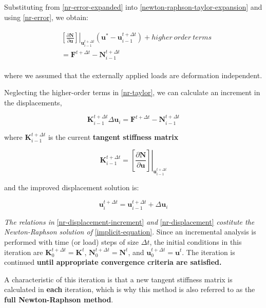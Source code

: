 \documentclass[10pt,b5paper,titlepage]{book}
\newcommand{\m}{\mathbf}
\newenvironment{eqarray}
{
    \begin{eqnarray}
        \begin{aligned}
}
{
        \end{aligned}
    \end{eqnarray}
}
\begin{document}
Substituting from \eqref{nr-error-expanded} into \eqref{newton-raphson-taylor-expansion}
and using \eqref{nr-error}, we obtain:

\begin{eqarray}\label{nr-taylor}
    & \left. \left[ \frac{\partial \m{N}}{\partial \m{u}} \right]
        \right|_{\m{u}_{i-1}^{t + \Delta t}}
    \left(\m{u}^* - \m{u}_{i-1}^{t + \Delta t} \right)
    + higher\ order\ terms\\
    & = \m{F}^{t + \Delta t} - \m{N}_{i-1}^{t + \Delta t}
\end{eqarray}

where we assumed that the externally applied loads are deformation independent.

Neglecting the higher-order terms in \eqref{nr-taylor}, we can calculate an increment
in the displacements,

\begin{equation}\label{nr-displacement-increment}
    \m{K}_{i-1}^{t + \Delta t} \Delta \m{u}_i =
    \m{F}^{t + \Delta t} - \m{N}_{i-1}^{t + \Delta t}
\end{equation}

where $ \m{K}_{i-1}^{t + \Delta t} $ is the current \textbf{tangent stiffness matrix}

\begin{equation}
     \m{K}_{i-1}^{t + \Delta t} =
     \left. \left[ \frac{\partial \m{N}}{\partial \m{u}} \right]
        \right|_{\m{u}_{i-1}^{t + \Delta t}}
\end{equation}

and the improved displacement solution is:

\begin{equation}\label{nr-displacement}
    \m{u}_i^{t + \Delta t} =
    \m{u}_{i-1}^{t + \Delta t} +
    \Delta \m{u}_{i}
\end{equation}

\textit{The relations in} \eqref{nr-displacement-increment} \textit{and} \eqref{nr-displacement}
\textit{costitute the Newton-Raphson solution of} \eqref{implicit-equation}.
Since an incremental analysis is performed with time (or load) steps of size
$ \Delta t $, the initial conditions in this iteration are
$ \m{K}_0^{t + \Delta t} = \m{K}^t $,
$ \m{N}_0^{t + \Delta t} = \m{N}^t $, and
$ \m{u}_0^{t + \Delta t} = \m{u}^t $.
The iteration is continued \textbf{until appropriate convergence criteria are satisfied.}

A characteristic of this iteration is that a new tangent stiffness matrix is
calculated in \textbf{each} iteration, which is why this method is also referred
to as the \textbf{full Newton-Raphson method}.
\end{document}
